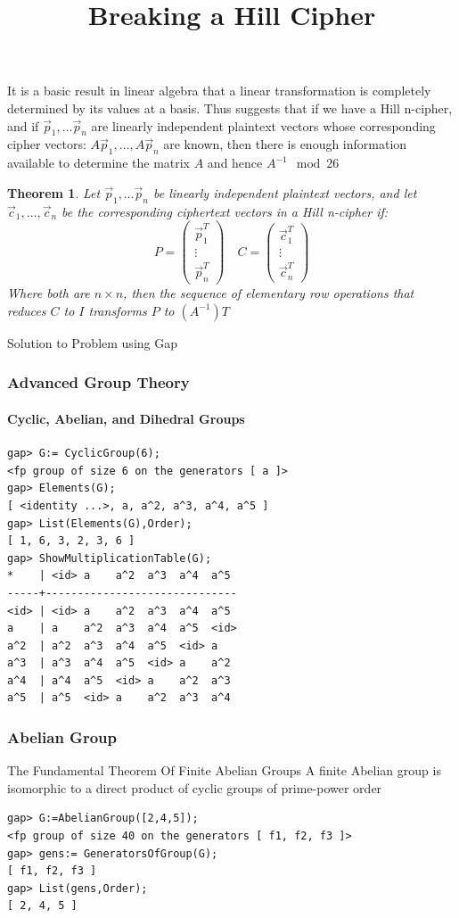 \documentclass{beamer}
\newtheorem{thm}{Theorem}
\theoremstyle{definition}
\theoremstyle{remark}
\begin{document}
\LogoOff
\begin{frame}
	\title{Breaking a Hill Cipher}
	It is a basic result in linear algebra that a linear transformation is completely determined by its values at a basis. Thus suggests that if we have a Hill n-cipher, and if $ \vec{p}_1,\ldots \vec{p}_n $ are linearly independent plaintext vectors whose corresponding cipher vectors: $ A\vec{p}_1, \ldots, A \vec{p}_n $ are known, then there is enough information available to determine the matrix $ A $ and hence $ A^{-1} \mod 26 $
	\begin{thm}
		Let $ \vec{p}_1,\ldots \vec{p}_n $ be linearly independent plaintext vectors, and let $ \vec{c}_1,\ldots, \vec{c}_n $ be the corresponding ciphertext vectors in a Hill n-cipher if:
		\[ P = \begin{pmatrix}
		\vec{p}_1^T \\
		\vdots \\
		\vec{p}_n^T
		\end{pmatrix} \quad C =
		\begin{pmatrix}
		\vec{c}_1^T \\
		\vdots \\
		\vec{c}_n^T
		\end{pmatrix} \]
		Where both are $ n \times n $, then the sequence of elementary row operations that reduces $ C $  to $ I $ transforms $ P $ to $ (A^{-1})T $
	\end{thm}
	
\end{frame}

\begin{frame}
	Solution to Problem using Gap
\end{frame}
\LogoOn
\begin{frame}[fragile]
	\frametitle{Advanced Group Theory}
	\framesubtitle{Cyclic, Abelian, and Dihedral Groups}
\begin{verbatim}
gap> G:= CyclicGroup(6);
<fp group of size 6 on the generators [ a ]>
gap> Elements(G);
[ <identity ...>, a, a^2, a^3, a^4, a^5 ]
gap> List(Elements(G),Order);
[ 1, 6, 3, 2, 3, 6 ]
gap> ShowMultiplicationTable(G);
*    | <id> a    a^2  a^3  a^4  a^5
-----+------------------------------
<id> | <id> a    a^2  a^3  a^4  a^5
a    | a    a^2  a^3  a^4  a^5  <id>
a^2  | a^2  a^3  a^4  a^5  <id> a
a^3  | a^3  a^4  a^5  <id> a    a^2
a^4  | a^4  a^5  <id> a    a^2  a^3
a^5  | a^5  <id> a    a^2  a^3  a^4
\end{verbatim}
\end{frame}

\begin{frame}[fragile]
	\frametitle{Abelian Group}
	\begin{alertblock}{The Fundamental Theorem Of Finite Abelian Groups}
		A finite Abelian group is isomorphic to a direct product of cyclic groups of prime-power order
	\end{alertblock}
\begin{verbatim}
gap> G:=AbelianGroup([2,4,5]);
<fp group of size 40 on the generators [ f1, f2, f3 ]>
gap> gens:= GeneratorsOfGroup(G);
[ f1, f2, f3 ]
gap> List(gens,Order);
[ 2, 4, 5 ]
\end{verbatim}
\end{frame}
\end{document}
